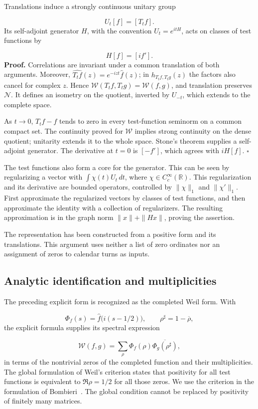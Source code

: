 Translations induce a strongly continuous unitary group

\[
U_t[f]=[T_tf].
\]
Its self-adjoint generator \(H\), with the convention \(U_t=e^{itH}\), acts on classes of test functions by

\[
H[f]=[i f'].
\]
\textbf{Proof.} Correlations are invariant under a common translation of both arguments. Moreover, \(\widehat{T_tf}(z)=e^{-izt}\widehat f(z)\); in \(h_{T_tf,T_tg}(z)\) the factors also cancel for complex \(z\). Hence \(\mathscr W(T_tf,T_tg)=\mathscr W(f,g)\), and translation preserves \(\mathcal N\). It defines an isometry on the quotient, inverted by \(U_{-t}\), which extends to the complete space.

As \(t\to0\), \(T_tf-f\) tends to zero in every test-function seminorm on a common compact set. The continuity proved for \(\mathscr W\) implies strong continuity on the dense quotient; unitarity extends it to the whole space. Stone's theorem supplies a self-adjoint generator. The derivative at \(t=0\) is \([-f']\), which agrees with \(iH[f]\). \hfill\(\square\)

The test functions also form a core for the generator. This can be seen by regularizing a vector with \(\int\chi(t)U_t\,dt\), where \(\chi\in C_c^\infty(\mathbb R)\). This regularization and its derivative are bounded operators, controlled by \(\|\chi\|_1\) and \(\|\chi'\|_1\). First approximate the regularized vectors by classes of test functions, and then approximate the identity with a collection of regularizers. The resulting approximation is in the graph norm \(\|x\|+\|Hx\|\), proving the assertion.

The representation has been constructed from a positive form and its translations. This argument uses neither a list of zero ordinates nor an assignment of zeros to calendar turns as inputs.

\subsection{Analytic identification and multiplicities}
\label{rz:identificacion}
The preceding explicit form is recognized as the completed Weil form. With

\[
\Phi_f(s)=\widehat f\bigl(i(s-1/2)\bigr),
\qquad \rho^\sharp=1-\overline\rho,
\]
the explicit formula supplies its spectral expression

\[
\mathscr W(f,g)=\sum_\rho
\Phi_f(\rho)\overline{\Phi_g(\rho^\sharp)},
\]
in terms of the nontrivial zeros of the completed function and their multiplicities.
The global formulation of Weil's criterion states that positivity for
all test functions is equivalent to \(\Re\rho=1/2\) for all
those zeros. We use the criterion in the formulation of
Bombieri~\cite{bombieri2000}. The global condition cannot be replaced
by positivity of finitely many matrices.

